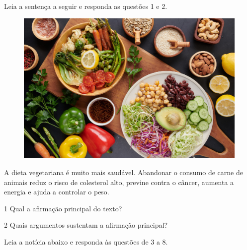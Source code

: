 Leia a sentença a seguir e responda as questões 1 e 2. 

\begin{myquote}

\begin{figure}[H]
\centering
\includegraphics[scale=0.35]{./imgSAEB_7_POR/media/image25.png}
\end{figure}

A dieta vegetariana é muito mais saudável. Abandonar o consumo de carne de animais 
reduz o risco de colesterol alto, previne contra o câncer, aumenta a energia e ajuda a
controlar o peso.


\end{myquote}

\num{1} Qual a afirmação principal do texto?


\pagebreak 

\num{2} Quais argumentos sustentam a afirmação principal?


Leia a notícia abaixo e responda às questões de 3 a 8.

